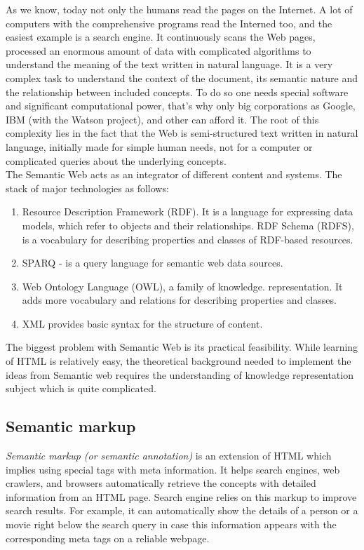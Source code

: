 As we know, today not only the humans read the pages on the Internet. A lot of computers with the comprehensive programs read the Interned too, and the easiest example is a search engine. It continuously scans the Web pages, processed an enormous amount of data with complicated algorithms to understand the meaning of the text written in natural language. It is a very complex task to understand the context of the document, its semantic nature and the relationship between included concepts. To do so one needs special software and significant computational power, that's why only big corporations as Google, IBM (with the Watson project), and other can afford it. The root of this complexity lies in the fact that the Web is semi-structured text written in natural language, initially made for simple human needs, not for a computer or complicated queries about the underlying concepts.\\ 

The Semantic Web acts as an integrator of different content and systems. The stack of major technologies as follows: 

\begin{enumerate}
    \item Resource Description Framework (RDF). It is a language for expressing data models, which refer to objects and their relationships. 
    \itme RDF Schema (RDFS), is a vocabulary for describing properties and classes of RDF-based resources.
    \item SPARQ - is a query language for semantic web data sources.
    \item Web Ontology Language (OWL), a family of knowledge. representation. It adds more vocabulary and relations for describing properties and classes.
    \item XML provides basic syntax for the structure of content.
\end{enumerate}

The biggest problem with Semantic Web is its practical feasibility. While learning of HTML is relatively easy, the theoretical background needed to implement the ideas from Semantic web requires the understanding of knowledge representation subject which is quite complicated. 

\subsection{Semantic markup}
\textit{Semantic markup (or semantic annotation)} is an extension of HTML which implies using special tags with meta information. It helps search engines, web crawlers, and browsers automatically retrieve the concepts with detailed information from an HTML page. Search engine relies on this markup to improve search results. For example, it can automatically show the details of a person or a movie right below the search query in case this information appears with the corresponding meta tags on a reliable webpage.\\ 

